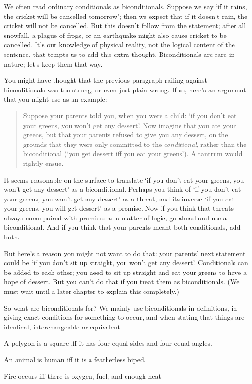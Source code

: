 \documentclass[PHIL101-Textbook.tex]{subfiles}
\begin{document}
We often read ordinary conditionals as biconditionals. Suppose we say `if it rains, the cricket will be cancelled tomorrow'; then we expect that if it doesn't rain, the cricket will not be cancelled. But this doesn't follow from the statement; after all snowfall, a plague of frogs, or an earthquake might also cause cricket to be cancelled. It's our knowledge of physical reality, not the logical content of the sentence, that tempts us to add this extra thought. Biconditionals are rare in nature; let's keep them that way.


You might have thought that the previous paragraph railing against biconditionals was too strong, or even just plain wrong. If so, here's an argument that you might use as an example:

	\begin{quotation}
	\noindent Suppose your parents told you, when you were a child: `if you don't eat your greens, you won't get any dessert'. Now imagine that you ate your greens, but that your parents refused to give you any dessert, on the grounds that they were only committed to the \emph{conditional}, rather than the biconditional (`you get dessert iff you eat your greens'). A tantrum would rightly ensue.
	\end{quotation} 

It seems reasonable on the surface to translate `if you don't eat your greens, you won't get any dessert' as a biconditional. Perhaps you think of `if you don't eat your greens, you won't get any dessert' as a threat, and its inverse `if you eat your greens, you will get dessert' as a promise. Now if you think that threats always come paired with promises as a matter of logic, go ahead and use a biconditional. And if you think that your parents meant both conditionals, add both.

But here's a reason you might not want to do that: your parents' next statement could be `if you don't sit up straight, you won't get any dessert'. Conditionals can be added to each other; you need to sit up straight and eat your greens to have a hope of dessert. But you can't do that if you treat them as biconditionals. (We must wait until a later chapter to explain this completely.)

So what are biconditionals for? We mainly use biconditionals in definitions, in giving exact conditions for something to occur, and when stating that things are identical, interchangeable or equivalent.
	\begin{earg}
		\item[\ex{iff4}] A polygon is a square iff it has four equal sides and four equal angles.
		\item[\ex{iff5}] An animal is human iff it is a featherless biped.
		\item[\ex{iff6}] Fire occurs iff there is oxygen, fuel, and enough heat.
	\end{earg}
\end{document}
